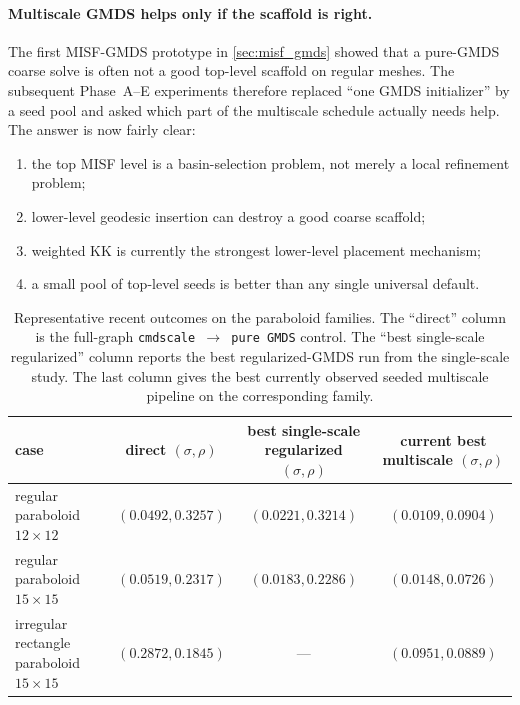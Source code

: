 \documentclass[11pt]{article}
\theoremstyle{definition}
\theoremstyle{plain}
\theoremstyle{remark}
\begin{document}
\paragraph{Multiscale GMDS helps only if the scaffold is right.}
The first MISF-GMDS prototype in \cref{sec:misf_gmds} showed that a pure-GMDS
coarse solve is often not a good top-level scaffold on regular meshes.  The
subsequent Phase~A--E experiments therefore replaced ``one GMDS initializer''
by a seed pool and asked which part of the multiscale schedule actually needs
help.  The answer is now fairly clear:
\begin{enumerate}
  \item the top MISF level is a basin-selection problem, not merely a local
  refinement problem;
  \item lower-level geodesic insertion can destroy a good coarse scaffold;
  \item weighted KK is currently the strongest lower-level placement mechanism;
  \item a small pool of top-level seeds is better than any single universal
  default.
\end{enumerate}

\begin{table}[t]
  \centering
  \small
  \caption{Representative recent outcomes on the paraboloid families.  The
  ``direct'' column is the full-graph \texttt{cmdscale $\rightarrow$ pure GMDS}
  control.  The ``best single-scale regularized'' column reports the best
  regularized-GMDS run from the single-scale study.  The last column gives the
  best currently observed seeded multiscale pipeline on the corresponding
  family.}
  \label{tab:recent_paraboloid_results}
  \begin{tabular}{lccc}
    \toprule
    case & direct $(\sigma,\rho)$ & best single-scale regularized $(\sigma,\rho)$ & current best multiscale $(\sigma,\rho)$ \\
    \midrule
    regular paraboloid $12\times 12$ & $(0.0492, 0.3257)$ & $(0.0221, 0.3214)$ & $(0.0109, 0.0904)$ \\
    regular paraboloid $15\times 15$ & $(0.0519, 0.2317)$ & $(0.0183, 0.2286)$ & $(0.0148, 0.0726)$ \\
    irregular rectangle paraboloid $15\times 15$ & $(0.2872, 0.1845)$ & --- & $(0.0951, 0.0889)$ \\
    \bottomrule
  \end{tabular}
\end{table}
\end{document}
